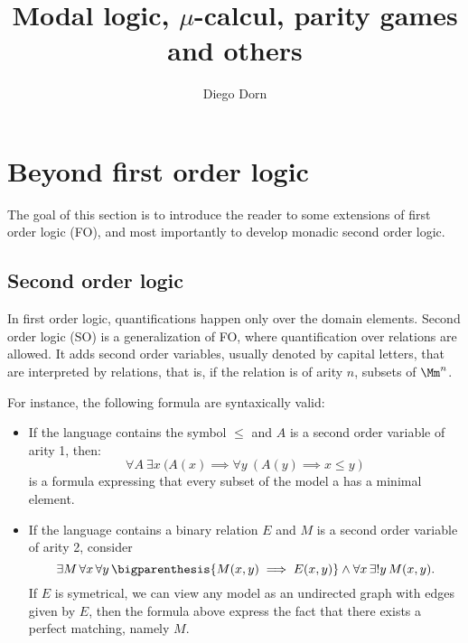 

\title{Modal logic, $\mu$-calcul, parity games and others}
\author{Diego Dorn}

\newcommand{\infiniteWords}{\infseq{(\IB^n)}}



\maketitle

\section{Beyond first order logic}

The goal of this section is to introduce the reader
to some extensions of first order logic (FO),
and most importantly to develop monadic second order logic.

\subsection{Second order logic}

In first order logic, quantifications happen only over the
domain elements.
Second order logic (SO) is a generalization of FO,
where quantification over relations are allowed.
It adds second order variables, usually denoted by capital
letters, that are interpreted by relations, that is,
if the relation is of arity $n$, subsets of $\Mm^n$.

For instance, the following formula are syntaxically valid:
\begin{itemize}
    \item If the language contains the symbol $\leq$
        and $A$ is a second order variable of arity 1, then:
    \[
        \forall A ~ \exists x ~
            (A(x) \implies \forall y ~
                (A(y) \implies x \leq y)
    \]
        is a formula expressing that every subset of the model
        a has a minimal element.
    \item If the language contains a binary relation $E$
        and $M$ is a second order variable of arity 2,
        consider
        \[
            \exists M\, \forall x\, \forall y \,
            \bigparenthesis{M(x, y) \implies E(x, y)}
            \wedge \forall x \, \exists! y \, M(x, y).
        \]
        If $E$ is symetrical, we can view any model as an
        undirected graph with edges given by $E$, then
        the formula above express the fact that
        there exists a perfect matching, namely $M$.
\end{itemize}

